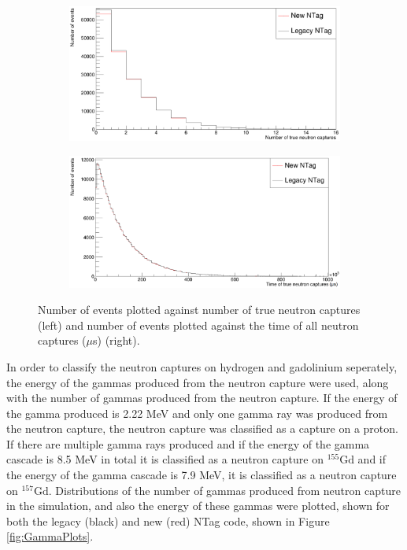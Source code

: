 \begin{figure}
    \centering
     \begin{subfigure}[b]{0.49\linewidth}
      \includegraphics[width=\linewidth]{Figures/NTrueCaptures.PNG}
     \end{subfigure}
     \begin{subfigure}[b]{0.49\linewidth}
       \includegraphics[width=\linewidth]{Figures/TrueCaptureTime.PNG}
      \end{subfigure} 
      \caption{Number of events plotted against number of true neutron captures (left) and number of events plotted against the time of all neutron captures ($\mu$s) (right). }
      \label{fig:NCapTime}
\end{figure}

In order to classify the neutron captures on hydrogen and gadolinium seperately, the energy of the gammas produced from the neutron capture were used, along with the number of gammas produced from the neutron capture. If the energy of the gamma produced is 2.22 MeV and only one gamma ray was produced from the neutron capture, the neutron capture was classified as a capture on a proton. If there are multiple gamma rays produced and if the energy of the gamma cascade is 8.5 MeV in total it is classified as a neutron capture on ${ }^{155} \mathrm{Gd}$ and if the energy of the gamma cascade is 7.9 MeV, it is classified as a neutron capture on ${ }^{157} \mathrm{Gd}$. Distributions of the number of gammas produced from neutron capture in the simulation, and also the energy of these gammas were plotted, shown for both the legacy (black) and new (red) NTag code, shown in Figure \ref{fig:GammaPlots}. 

